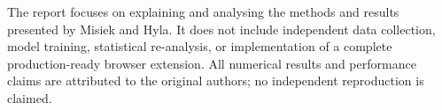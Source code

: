 The report focuses on explaining and analysing the methods and results presented by Misiek and Hyla. It does not include independent data collection, model training, statistical re-analysis, or implementation of a complete production-ready browser extension. All numerical results and performance claims are attributed to the original authors; no independent reproduction is claimed.\cite{bib1}
